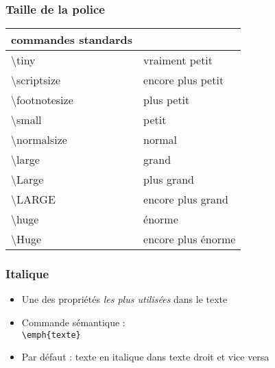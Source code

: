 \begin{frame}

	\frametitle{Taille de la police}
		
	\begin{center}
		\begin{tabular}{ll}
			\hline\hline
			\textbf{commandes standards}	&									\\
			\hline
			\textbackslash tiny				&	{\tiny vraiment petit} 			\\
			\textbackslash scriptsize		&	{\scriptsize encore plus petit}	\\
			\textbackslash footnotesize		&	{\footnotesize plus petit}		\\
			\textbackslash small			&	{\small petit}					\\
			\textbackslash normalsize		&	{\normalsize normal}			\\
			\textbackslash large			&	{\large grand}					\\
			\textbackslash Large			&	{\Large plus grand}				\\
			\textbackslash LARGE			&	{\LARGE encore plus grand}		\\
			\textbackslash huge				&	{\huge énorme} 					\\
			\textbackslash Huge				&	{\Huge encore plus énorme}		\\
			\hline\hline
		\end{tabular}
	\end{center}
\end{frame}


\begin{frame}[fragile]

	\frametitle{Italique}
	
	\begin{itemize}
		\item Une des propriétés \emph{les plus utilisées} dans le texte
		\item Commande sémantique : \\
		\lstinline|\emph{texte}|
		
		\pause
		
		\item Par défaut : texte en italique dans texte droit et vice versa
	\end{itemize}
\end{frame}
